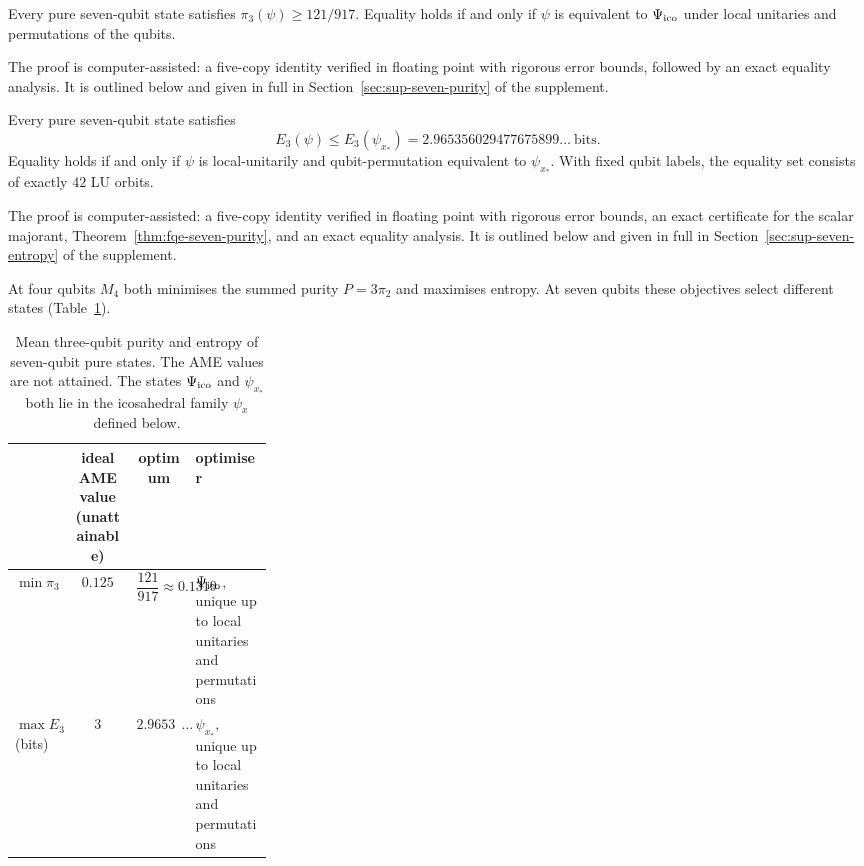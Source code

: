 \begin{theorem}\label{thm:fqe-seven-purity}
Every pure seven-qubit state satisfies $\pi_3(\psi)\ge121/917$. Equality holds if and only if $\psi$ is
equivalent to $\Psi_{\mathrm{ico}}$ under local unitaries and permutations of the qubits.
\end{theorem}
\noindent The proof is computer-assisted: a five-copy identity verified in floating point with rigorous error bounds,
followed by an exact equality analysis. It is outlined below and given in full in Section~\ref{sec:sup-seven-purity} of
the supplement.

\begin{theorem}
\label{thm:fqe-seven-entropy}
Every pure seven-qubit state satisfies
\[
 E_3(\psi)\le E_3(\psi_{x_*})=2.965356029477675899\ldots\ \text{bits}.
\]
Equality holds if and only if $\psi$ is local-unitarily and qubit-permutation equivalent to $\psi_{x_*}$.
With fixed qubit labels, the equality set consists of exactly $42$ LU orbits.
\end{theorem}
\noindent The proof is computer-assisted: a five-copy identity verified in floating point with rigorous error bounds,
an exact certificate for the scalar majorant, Theorem~\ref{thm:fqe-seven-purity}, and an exact equality analysis. It is
outlined below and given in full in Section~\ref{sec:sup-seven-entropy} of the supplement.

At four qubits $M_4$ both minimises the summed purity $P=3\pi_2$ and maximises entropy. At seven qubits these
objectives select different states (Table~\ref{tab:fqe-seven-summary}).

\begin{table}[htbp]
\centering\small
\begin{tabular}{@{}lccp{0.3\linewidth}@{}}
\toprule
 & ideal AME value (unattainable) & optimum & optimiser \\
\midrule
$\min\pi_3$ & $0.125$ & $\dfrac{121}{917}\approx0.131952$ & $\Psi_{\mathrm{ico}}$, unique up to local unitaries and permutations \\[2ex]
$\max E_3$ (bits) & $3$ & $2.96535602947\ldots$ & $\psi_{x_*}$, unique up to local unitaries and permutations \\
\bottomrule
\end{tabular}
\caption{Mean three-qubit purity and entropy of seven-qubit pure states. The AME values are not attained. The states
$\Psi_{\mathrm{ico}}$ and $\psi_{x_*}$ both lie in the icosahedral family $\psi_x$ defined below.}
\label{tab:fqe-seven-summary}
\end{table}

